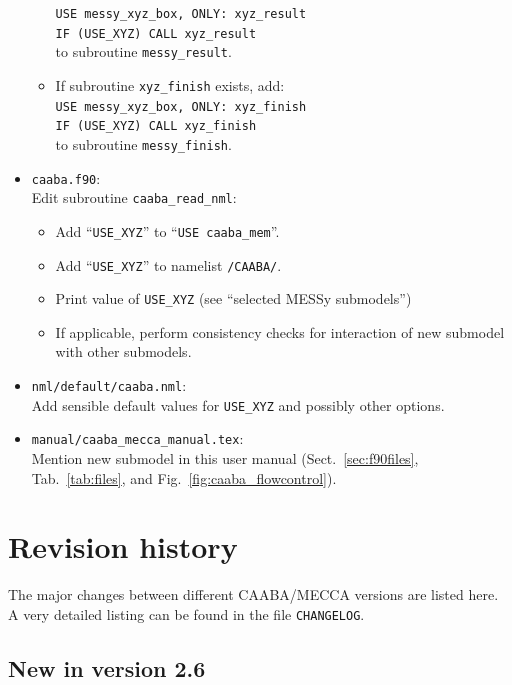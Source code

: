 \documentclass[twoside]{article}
\begin{document}
\begin{itemize}
\begin{itemize}
    \verb|USE messy_xyz_box, ONLY: xyz_result|\\
    \verb|IF (USE_XYZ) CALL xyz_result|\\
    to subroutine \verb|messy_result|.
  \item If subroutine \verb|xyz_finish| exists, add:\\
    \verb|USE messy_xyz_box, ONLY: xyz_finish|\\
    \verb|IF (USE_XYZ) CALL xyz_finish|\\
    to subroutine \verb|messy_finish|.
  \end{itemize}
\item \verb|caaba.f90|:\\
  Edit subroutine \verb|caaba_read_nml|:
  \begin{itemize}
  \item Add ``\verb|USE_XYZ|'' to ``\verb|USE caaba_mem|''.
  \item Add ``\verb|USE_XYZ|'' to namelist \verb|/CAABA/|.
  \item Print value of \verb|USE_XYZ| (see ``selected MESSy submodels'')
  \item If applicable, perform consistency checks for interaction of new
    submodel with other submodels.
  \end{itemize}
\item \verb|nml/default/caaba.nml|:\\
  Add sensible default values for \verb|USE_XYZ| and possibly other
  options.
\item \verb|manual/caaba_mecca_manual.tex|:\\
  Mention new submodel in this user manual (Sect.~\ref{sec:f90files},
  Tab.~\ref{tab:files}, and Fig.~\ref{fig:caaba_flowcontrol}).
\end{itemize}

\section{Revision history}

The major changes between different CAABA/MECCA versions are listed
here. A very detailed listing can be found in the file \verb|CHANGELOG|.

\subsection{New in version 2.6}
\end{document}
